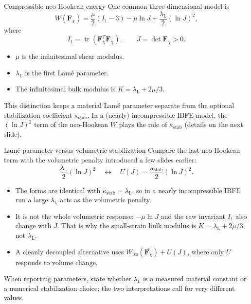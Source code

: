 \documentclass[aspectratio=169,11pt]{beamer}
\newcommand{\Fdef}{\bm{F}_{\chi}}
\begin{document}
\begin{frame}{Compressible neo-Hookean energy}
One common three-dimensional model is
\[
  \boxed{
  W(\Fdef)
  =
  \frac{\mu}{2}(I_1-3)
  -\mu\ln J
  +\frac{\lambda_{\mathrm L}}{2}(\ln J)^2
  },
\]
where
\[
  I_1=\operatorname{tr}(\Fdef^T\Fdef),
  \qquad
  J=\det\Fdef>0.
\]
\begin{itemize}\itemsep5pt
  \item \(\mu\) is the infinitesimal shear modulus.
  \item \(\lambda_{\mathrm L}\) is the first Lamé parameter.
  \item The infinitesimal bulk modulus is
  \(K=\lambda_{\mathrm L}+2\mu/3\).
\end{itemize}
\medskip
\begin{punchbox}
\small
This distinction keeps a material Lamé parameter separate from the optional stabilization coefficient \(\kappa_{\mathrm{stab}}\). In a (nearly) incompressible IBFE model, the \((\ln J)^2\) term of the neo-Hookean \(W\) plays the role of \(\kappa_{\mathrm{stab}}\) (details on the next slide).
\end{punchbox}
\end{frame}

\begin{frame}{Lamé parameter versus volumetric stabilization}
Compare the last neo-Hookean term with the volumetric penalty introduced a few slides earlier:
\[
  \frac{\lambda_{\mathrm L}}{2}(\ln J)^2
  \quad\longleftrightarrow\quad
  U(J)=\frac{\kappa_{\mathrm{stab}}}{2}(\ln J)^2 .
\]
\begin{itemize}\itemsep6pt
  \item The forms are identical with \(\kappa_{\mathrm{stab}}=\lambda_{\mathrm L}\), so in a nearly incompressible IBFE run a large \(\lambda_{\mathrm L}\) acts as the volumetric penalty.
  \item It is not the whole volumetric response: \(-\mu\ln J\) and the raw invariant \(I_1\) also change with \(J\). That is why the small-strain bulk modulus is \(K=\lambda_{\mathrm L}+2\mu/3\), not \(\lambda_{\mathrm L}\).
  \item A cleanly decoupled alternative uses \(W_{\mathrm{iso}}(\bar{\Fdef})+U(J)\), where only \(U\) responds to volume change.
\end{itemize}
\medskip
\begin{punchbox}
\small
When reporting parameters, state whether \(\lambda_{\mathrm L}\) is a measured material constant or a numerical stabilization choice; the two interpretations call for very different values.
\end{punchbox}
\end{frame}
\end{document}
